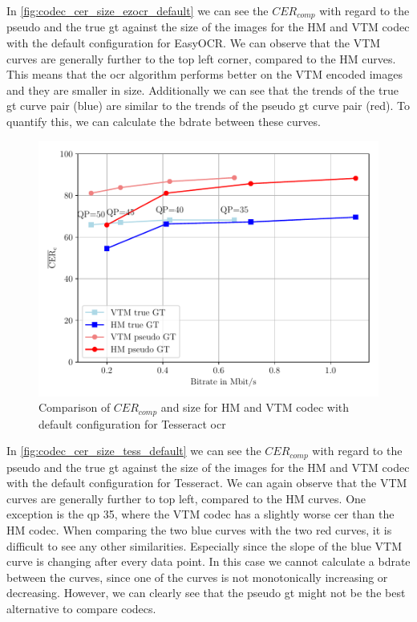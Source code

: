 In \autoref{fig:codec_cer_size_ezocr_default} we can see the $CER_{comp}$ with regard to the pseudo and the true \gls{gt} against the size of the images for the HM and VTM codec with the default configuration for EasyOCR.
We can observe that the VTM curves are generally further to the top left corner, compared to the HM curves.
This means that the \gls{ocr} algorithm performs better on the VTM encoded images and they are smaller in size.
Additionally we can see that the trends of the true \gls{gt} curve pair (blue) are similar to the trends of the pseudo \gls{gt} curve pair (red).
To quantify this, we can calculate the \gls{bdrate} between these curves.

\begin{figure}[h]
    \centering
    \includegraphics[width=\textwidth]{../images/analyze/codec_cer_size_tess_default.pdf}
    \caption{Comparison of $CER_{comp}$ and size for HM and VTM codec with default configuration for Tesseract \gls{ocr}}
    \label{fig:codec_cer_size_tess_default}
\end{figure}

In \autoref{fig:codec_cer_size_tess_default} we can see the $CER_{comp}$ with regard to the pseudo and the true \gls{gt} against the size of the images for the HM and VTM codec with the default configuration for Tesseract.
We can again observe that the VTM curves are generally further to top left, compared to the HM curves.
One exception is the \gls{qp} 35, where the VTM codec has a slightly worse \gls{cer} than the HM codec.
When comparing the two blue curves with the two red curves, it is difficult to see any other similarities.
Especially since the slope of the blue VTM curve is changing after every data point.
In this case we cannot calculate a \gls{bdrate} between the curves, since one of the curves is not monotonically increasing or decreasing.
However, we can clearly see that the pseudo \gls{gt} might not be the best alternative to compare codecs.


